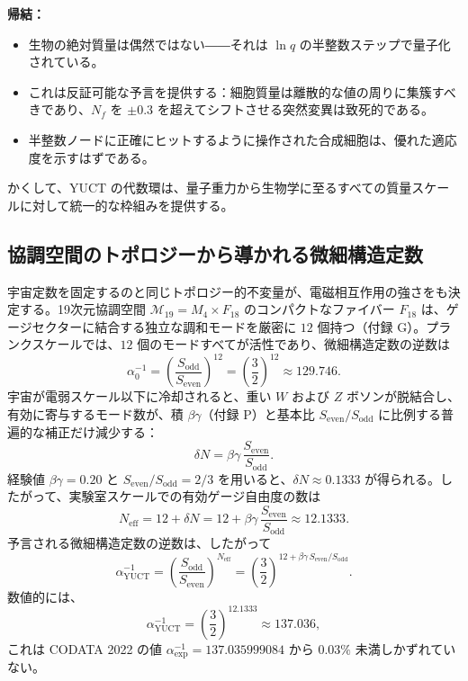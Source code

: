 \documentclass[12pt,a4paper]{article}
\begin{document}
	\textbf{帰結：}
	\begin{itemize}
		\item 生物の絶対質量は偶然ではない――それは \(\ln q\) の半整数ステップで量子化されている。
		\item これは反証可能な予言を提供する：細胞質量は離散的な値の周りに集簇すべきであり、\(N_f\) を \(\pm0.3\) を超えてシフトさせる突然変異は致死的である。
		\item 半整数ノードに正確にヒットするように操作された合成細胞は、優れた適応度を示すはずである。
	\end{itemize}
	
	かくして、YUCT の代数環は、量子重力から生物学に至るすべての質量スケールに対して統一的な枠組みを提供する。
	
	\subsection{協調空間のトポロジーから導かれる微細構造定数}
	\label{subsec:alpha-topology}
	
	宇宙定数を固定するのと同じトポロジー的不変量が、電磁相互作用の強さをも決定する。19次元協調空間 \(\mathcal{M}_{19}=M_4\times F_{18}\) のコンパクトなファイバー \(F_{18}\) は、ゲージセクターに結合する独立な調和モードを厳密に \(12\) 個持つ（付録 G）。プランクスケールでは、\(12\) 個のモードすべてが活性であり、微細構造定数の逆数は
	\begin{equation}
		\alpha_0^{-1} = \left(\frac{S_{\mathrm{odd}}}{S_{\mathrm{even}}}\right)^{12}
		= \left(\frac{3}{2}\right)^{12} \approx 129.746 .
	\end{equation}
	宇宙が電弱スケール以下に冷却されると、重い \(W\) および \(Z\) ボソンが脱結合し、有効に寄与するモード数が、積 \(\beta\gamma\)（付録 P）と基本比 \(S_{\mathrm{even}}/S_{\mathrm{odd}}\) に比例する普遍的な補正だけ減少する：
	\begin{equation}
		\delta N = \beta\gamma \, \frac{S_{\mathrm{even}}}{S_{\mathrm{odd}}} .
	\end{equation}
	経験値 \(\beta\gamma = 0.20\) と \(S_{\mathrm{even}}/S_{\mathrm{odd}} = 2/3\) を用いると、\(\delta N \approx 0.1333\) が得られる。したがって、実験室スケールでの有効ゲージ自由度の数は
	\begin{equation}
		N_{\mathrm{eff}} = 12 + \delta N = 12 + \beta\gamma\,\frac{S_{\mathrm{even}}}{S_{\mathrm{odd}}}
		\approx 12.1333 .
	\end{equation}
	予言される微細構造定数の逆数は、したがって
	\begin{equation}
		\boxed{\alpha^{-1}_{\mathrm{YUCT}} =
			\left(\frac{S_{\mathrm{odd}}}{S_{\mathrm{even}}}\right)^{N_{\mathrm{eff}}}
			= \left(\frac{3}{2}\right)^{12 + \beta\gamma\,S_{\mathrm{even}}/S_{\mathrm{odd}}} } .
		\label{eq:alpha-yuct}
	\end{equation}
	数値的には、
	\[
	\alpha^{-1}_{\mathrm{YUCT}} = \left(\frac{3}{2}\right)^{12.1333} \approx 137.036 ,
	\]
	これは CODATA 2022 の値 \(\alpha^{-1}_{\mathrm{exp}} = 137.035999084\) から \(0.03\%\) 未満しかずれていない。
	
\end{document}
